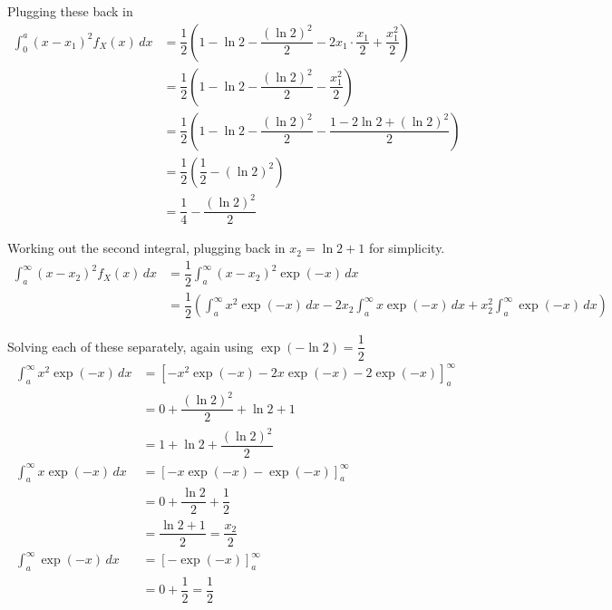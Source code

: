 \documentclass[11pt]{article}
\begin{document}
\begin{enumerate}[label=(\alph*)]
\begin{solution}
        Plugging these back in
        \begin{align*}
            \int_0^a (x - x_1)^2 f_X(x)\, dx &= \dfrac{1}{2} \left( 1 - \ln{2} - \dfrac{(\ln{2})^2}{2} - 2x_1 \cdot \dfrac{x_1}{2} + \dfrac{x_1^2}{2} \right) \\
            &= \dfrac{1}{2} \left( 1 - \ln{2} - \dfrac{(\ln{2})^2}{2} - \dfrac{x_1^2}{2} \right) \\
            &= \dfrac{1}{2} \left( 1 - \ln{2} - \dfrac{(\ln{2})^2}{2} - \dfrac{1 - 2\ln{2} + (\ln{2})^2}{2} \right) \\
            &= \dfrac{1}{2} \left( \dfrac{1}{2} - (\ln{2})^2 \right) \\
            &= \dfrac{1}{4} - \dfrac{(\ln{2})^2}{2}
        \end{align*}

        Working out the second integral, plugging back in $x_2 = \ln{2} + 1$ for simplicity.
        \begin{align*}
            \int_a^\infty (x - x_2)^2 f_X(x)\, dx &= \dfrac{1}{2} \int_a^\infty (x - x_2)^2 \exp(-x)\, dx \\
            &= \dfrac{1}{2} \left( \int_a^\infty x^2 \exp(-x)\, dx - 2x_2 \int_a^\infty x \exp(-x)\, dx + x_2^2 \int_a^\infty \exp(-x)\, dx \right)
        \end{align*}

        Solving each of these separately, again using $\exp(-\ln{2}) = \dfrac{1}{2}$
        \begin{align*}
            \int_a^\infty x^2 \exp(-x)\, dx &= \left[ -x^2 \exp(-x) - 2x \exp(-x) - 2\exp(-x) \right]_{a}^{\infty} \\
            &= 0 + \dfrac{(\ln{2})^2}{2} + \ln{2} + 1 \\
            &= 1 + \ln{2} + \dfrac{(\ln{2})^2}{2} \\[1em]
            \int_a^\infty x \exp(-x)\, dx &= \left[ -x \exp(-x) - \exp(-x) \right]_{a}^{\infty} \\
            &= 0 + \dfrac{\ln{2}}{2} + \dfrac{1}{2} \\
            &= \dfrac{\ln{2} + 1}{2} = \dfrac{x_2}{2} \\[1em]
            \int_a^\infty \exp(-x)\, dx &= \left[ -\exp(-x) \right]_{a}^{\infty} \\
            &= 0 + \dfrac{1}{2} = \dfrac{1}{2}
        \end{align*}


\end{solution}
\end{enumerate}
\end{document}
